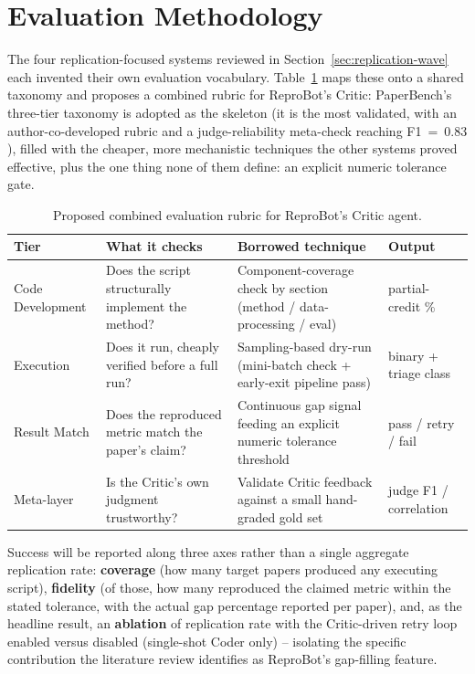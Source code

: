 \documentclass[10pt,twocolumn]{article}
\begin{document}
\section{Evaluation Methodology}
\label{sec:evaluation}

The four replication-focused systems reviewed in Section~\ref{sec:replication-wave}
each invented their own evaluation vocabulary. Table~\ref{tab:rubric} maps these onto a
shared taxonomy and proposes a combined rubric for ReproBot's Critic: PaperBench's
three-tier taxonomy is adopted as the skeleton (it is the most validated, with an
author-co-developed rubric and a judge-reliability meta-check reaching F1~=~0.83
\cite{starace2025paperbench}), filled with the cheaper, more mechanistic techniques the
other systems proved effective, plus the one thing none of them define: an explicit
numeric tolerance gate.

\begin{table}[t]
\centering
\small
\begin{tabular}{@{}p{2.4cm}p{3.6cm}p{5.6cm}p{2.2cm}@{}}
\toprule
\textbf{Tier} & \textbf{What it checks} & \textbf{Borrowed technique} & \textbf{Output} \\
\midrule
Code Development & Does the script structurally implement the method? & Component-coverage check by section (method / data-processing / eval) &
partial-credit \% \\
Execution & Does it run, cheaply verified before a full run? & Sampling-based dry-run (mini-batch check + early-exit pipeline pass) &
binary + triage class \\
Result Match & Does the reproduced metric match the paper's claim? & Continuous gap signal feeding an explicit numeric tolerance threshold &
pass / retry / fail \\
Meta-layer & Is the Critic's own judgment trustworthy? & Validate Critic feedback against a small hand-graded gold set &
judge F1 / correlation \\
\bottomrule
\end{tabular}
\caption{Proposed combined evaluation rubric for ReproBot's Critic agent.}
\label{tab:rubric}
\end{table}

Success will be reported along three axes rather than a single aggregate replication
rate: \textbf{coverage} (how many target papers produced any executing script),
\textbf{fidelity} (of those, how many reproduced the claimed metric within the stated
tolerance, with the actual gap percentage reported per paper), and, as the headline
result, an \textbf{ablation} of replication rate with the Critic-driven retry loop
enabled versus disabled (single-shot Coder only) -- isolating the specific contribution
the literature review identifies as ReproBot's gap-filling feature.
\end{document}
